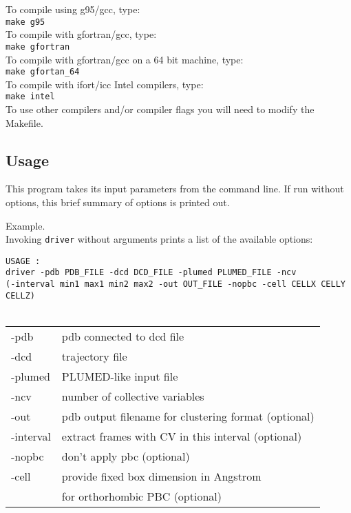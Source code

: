 \documentclass[12pt,fleqn]{report}
\newcommand{\esempio}[1]{
\vspace{10pt}
\begin{flushright}
\colorbox{light-gray}{
   \begin{minipage}{13cm}
       \scriptsize{
{\fontfamily{phv} \fontseries{b}
 \selectfont Example. \\
 \fontseries{m} \selectfont #1 } }
\end{minipage}}
\end{flushright}
\vspace{20pt}
}
\begin{document}
To compile using g95/gcc, type:
\vspace {5pt} \\
{\tt make g95}
\vspace {5pt}\\
To compile with gfortran/gcc, type:
\vspace {5pt}\\
{\tt make gfortran}
\vspace {5pt}\\
To compile with gfortran/gcc on a 64 bit machine, type:
\vspace {5pt}\\
{\tt make gfortan\_64}
\vspace {5pt}\\
To compile with ifort/icc Intel compilers, type:
\vspace {5pt}\\
{\tt make intel}
\vspace {5pt}\\

To use other compilers and/or compiler flags you will need to modify the Makefile.

\subsection{Usage}

This program takes its input parameters from the command line. If run 
without options, this brief summary of options is printed out. 

\esempio{Invoking {\tt driver} without arguments prints a list of the available options: \vspace{10pt} \\
{\tt USAGE : \\
 driver -pdb PDB\_FILE -dcd DCD\_FILE -plumed PLUMED\_FILE -ncv  \\
          (-interval min1 max1 min2 max2 -out OUT\_FILE -nopbc -cell CELLX CELLY CELLZ)\\
 \\
 \begin{tabular}{ l l }
 -pdb      &  pdb connected to dcd file\\
 -dcd      &  trajectory file\\
 -plumed    & PLUMED-like input file\\
 -ncv        & number of collective variables\\
 -out        & pdb output filename for clustering format (optional)\\
 -interval   & extract frames with CV in this interval (optional)\\
  -nopbc      & don't apply pbc                                   (optional) \\
 -cell       & provide fixed box dimension in Angstrom \\
& for orthorhombic PBC  (optional)
\end{tabular}
 }
}
\end{document}
